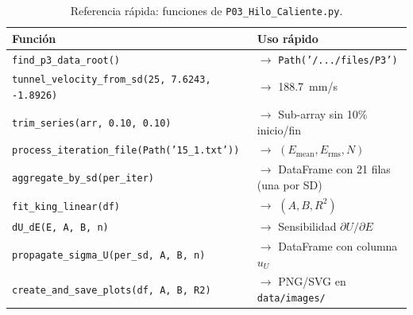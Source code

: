 \documentclass[12pt,a4paper]{article}
\begin{document}
\begin{table}[H]
	\centering
	\caption{Referencia rápida: funciones de \texttt{P03\_Hilo\_Caliente.py}.}
	\label{tab:ref_python}
	\small
	\begin{tabularx}{\textwidth}{l X}
		\toprule
		\textbf{Función} & \textbf{Uso rápido}                                  \\
		\midrule
		\texttt{find\_p3\_data\_root()}
		                 & $\rightarrow$ \texttt{Path('/.../files/P3')}         \\
		\texttt{tunnel\_velocity\_from\_sd(25, 7.6243, -1.8926)}
		                 & $\rightarrow$ \SI{188.7}{mm/s}                       \\
		\texttt{trim\_series(arr, 0.10, 0.10)}
		                 & $\rightarrow$ Sub-array sin 10\% inicio/fin          \\
		\texttt{process\_iteration\_file(Path('15\_1.txt'))}
		                 & $\rightarrow$ $(E_\mathrm{mean}, E_\mathrm{rms}, N)$ \\
		\texttt{aggregate\_by\_sd(per\_iter)}
		                 & $\rightarrow$ DataFrame con 21 filas (una por SD)    \\
		\texttt{fit\_king\_linear(df)}
		                 & $\rightarrow$ $(A, B, R^2)$                          \\
		\texttt{dU\_dE(E, A, B, n)}
		                 & $\rightarrow$ Sensibilidad $\partial U/\partial E$   \\
		\texttt{propagate\_sigma\_U(per\_sd, A, B, n)}
		                 & $\rightarrow$ DataFrame con columna $u_U$            \\
		\texttt{create\_and\_save\_plots(df, A, B, R2)}
		                 & $\rightarrow$ PNG/SVG en \texttt{data/images/}       \\
		\bottomrule
	\end{tabularx}
\end{table}
\end{document}
